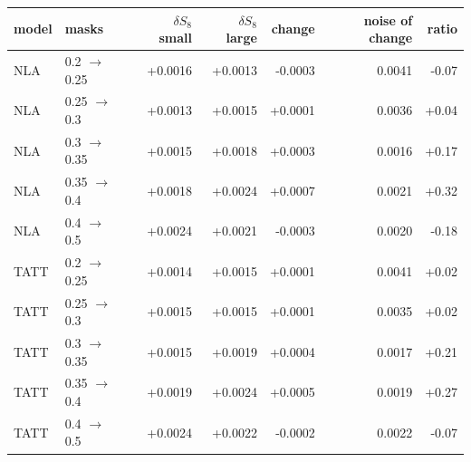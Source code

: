 \begin{tabular}{llrrrrr}\toprule
model & masks & $\delta S_8$ small & $\delta S_8$ large & change & noise of change & ratio\\ \midrule
NLA & 0.2 $\to$ 0.25 & +0.0016 & +0.0013 & -0.0003 & 0.0041 & -0.07\\
NLA & 0.25 $\to$ 0.3 & +0.0013 & +0.0015 & +0.0001 & 0.0036 & +0.04\\
NLA & 0.3 $\to$ 0.35 & +0.0015 & +0.0018 & +0.0003 & 0.0016 & +0.17\\
NLA & 0.35 $\to$ 0.4 & +0.0018 & +0.0024 & +0.0007 & 0.0021 & +0.32\\
NLA & 0.4 $\to$ 0.5 & +0.0024 & +0.0021 & -0.0003 & 0.0020 & -0.18\\
TATT & 0.2 $\to$ 0.25 & +0.0014 & +0.0015 & +0.0001 & 0.0041 & +0.02\\
TATT & 0.25 $\to$ 0.3 & +0.0015 & +0.0015 & +0.0001 & 0.0035 & +0.02\\
TATT & 0.3 $\to$ 0.35 & +0.0015 & +0.0019 & +0.0004 & 0.0017 & +0.21\\
TATT & 0.35 $\to$ 0.4 & +0.0019 & +0.0024 & +0.0005 & 0.0019 & +0.27\\
TATT & 0.4 $\to$ 0.5 & +0.0024 & +0.0022 & -0.0002 & 0.0022 & -0.07\\
\bottomrule\end{tabular}